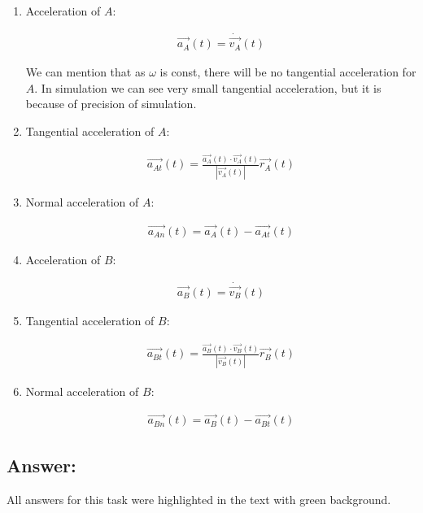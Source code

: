 \begin{enumerate}
    \item Acceleration of $A$:
          \begin{answer}

              \begin{align}
                  \vec{a_A}(t) = \dot{\vec{v_A}}(t)
              \end{align}
          \end{answer}
          We can mention that as $\omega$ is const, there will be no tangential acceleration for $A$.
          In simulation we can see very small tangential acceleration, but it is because of precision of simulation.
    \item Tangential acceleration of $A$:
          \begin{answer}

              \begin{align}
                  \vec{a_{At}}(t) = \frac{\vec{a_A}(t) \cdot \vec{v_{A}}(t)}{|\vec{v_{A}}(t)|} \vec{r_{A}}(t)
              \end{align}
          \end{answer}
    \item Normal acceleration of $A$:
          \begin{answer}

              \begin{align}
                  \vec{a_{An}}(t) = \vec{a_A}(t) - \vec{a_{At}}(t)
              \end{align}
          \end{answer}
    \item Acceleration of $B$:
          \begin{answer}

              \begin{align}
                  \vec{a_B}(t) = \dot{\vec{v_B}}(t)
              \end{align}
          \end{answer}
    \item Tangential acceleration of $B$:
          \begin{answer}

              \begin{align}
                  \vec{a_{Bt}}(t) = \frac{\vec{a_B}(t) \cdot \vec{v_{B}}(t)}{|\vec{v_{B}}(t)|} \vec{r_{B}}(t)
              \end{align}
          \end{answer}
    \item Normal acceleration of $B$:
          \begin{answer}

              \begin{align}
                  \vec{a_{Bn}}(t) = \vec{a_B}(t) - \vec{a_{Bt}}(t)
              \end{align}
          \end{answer}
\end{enumerate}

\subsection*{Answer:}

All answers for this task were highlighted in the text with green background.